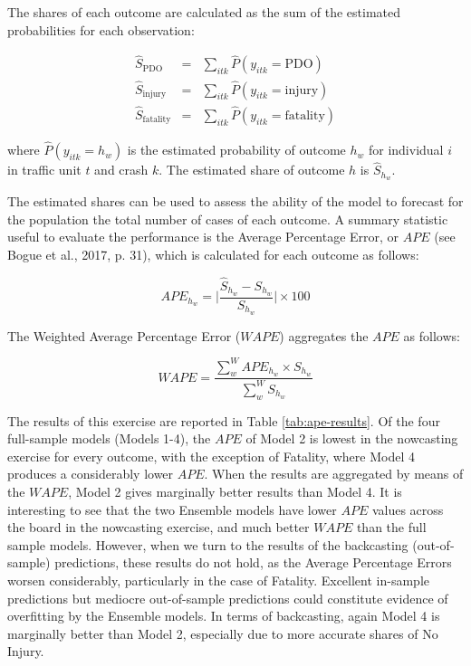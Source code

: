 \documentclass[]{elsarticle} %
\begin{document}
The shares of each outcome are calculated as the sum of the estimated
probabilities for each observation:

\begin{equation}
\label{eq:predicted-shares}
\begin{array}{rcl}
\hat{S}_{\text{PDO}} &=& \sum_{itk}\hat{P}(y_{itk}=\text{PDO})\\
\hat{S}_{\text{injury}} &=& \sum_{itk}\hat{P}(y_{itk}=\text{injury})\\
\hat{S}_{\text{fatality}} &=& \sum_{itk}\hat{P}(y_{itk}=\text{fatality})
\end{array}
\end{equation}

\noindent where \(\hat{P}(y_{itk}=h_w)\) is the estimated probability of
outcome \(h_w\) for individual \(i\) in traffic unit \(t\) and crash
\(k\). The estimated share of outcome \(h\) is \(\hat{S}_{h_w}\).

The estimated shares can be used to assess the ability of the model to
forecast for the population the total number of cases of each outcome. A
summary statistic useful to evaluate the performance is the Average
Percentage Error, or \(APE\) (see Bogue et al., 2017, p. 31), which is
calculated for each outcome as follows:

\begin{equation}
\label{eq:APE}
APE_{h_w} = \Bigg|\frac{\hat{S}_{h_w} - S_{h_w}}{S_{h_w}}\Bigg|\times 100
\end{equation}

The Weighted Average Percentage Error (\(WAPE\)) aggregates the \(APE\)
as follows:

\begin{equation}
\label{eq:WAPE}
WAPE = \frac{\sum_w^WAPE_{h_w}\times S_{h_w}}{\sum_w^WS_{h_w}}
\end{equation}

The results of this exercise are reported in Table
\ref{tab:ape-results}. Of the four full-sample models (Models 1-4), the
\(APE\) of Model 2 is lowest in the nowcasting exercise for every
outcome, with the exception of Fatality, where Model 4 produces a
considerably lower \(APE\). When the results are aggregated by means of
the \(WAPE\), Model 2 gives marginally better results than Model 4. It
is interesting to see that the two Ensemble models have lower \(APE\)
values across the board in the nowcasting exercise, and much better
\(WAPE\) than the full sample models. However, when we turn to the
results of the backcasting (out-of-sample) predictions, these results do
not hold, as the Average Percentage Errors worsen considerably,
particularly in the case of Fatality. Excellent in-sample predictions
but mediocre out-of-sample predictions could constitute evidence of
overfitting by the Ensemble models. In terms of backcasting, again Model
4 is marginally better than Model 2, especially due to more accurate
shares of No Injury.
\end{document}
